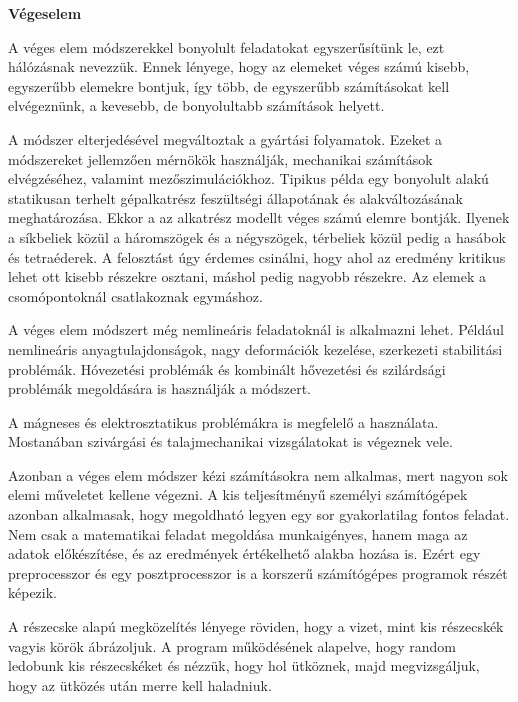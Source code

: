 


\textbf{Végeselem}

A véges elem módszerekkel
bonyolult feladatokat egyszerűsítünk le, ezt hálózásnak nevezzük. Ennek lényege, hogy az elemeket véges számú kisebb, egyszerűbb elemekre bontjuk, így több, de egyszerűbb számításokat kell elvégeznünk, a kevesebb, de bonyolultabb számítások helyett.


A módszer elterjedésével megváltoztak a gyártási folyamatok. Ezeket a módszereket jellemzően mérnökök használják, mechanikai számítások elvégzéséhez, valamint mezőszimulációkhoz. Tipikus példa egy bonyolult alakú statikusan terhelt gépalkatrész feszültségi állapotának és alakváltozásának meghatározása. Ekkor a az alkatrész modellt véges számú elemre bontják. Ilyenek a síkbeliek közül a háromszögek és a négyszögek, térbeliek közül pedig a hasábok és tetraéderek. A felosztást úgy érdemes csinálni, hogy ahol az eredmény kritikus lehet ott kisebb részekre osztani, máshol pedig nagyobb részekre. Az elemek a csomópontoknál csatlakoznak egymáshoz. 


A véges elem módszert még nemlineáris feladatoknál is alkalmazni lehet. Például nemlineáris anyagtulajdonságok, nagy deformációk kezelése, szerkezeti stabilitási problémák. Hóvezetési problémák és kombinált hővezetési és szilárdsági problémák megoldására is használják a módszert. 


A mágneses és elektrosztatikus problémákra is megfelelő a használata. Mostanában szivárgási és talajmechanikai vizsgálatokat is végeznek vele. 

Azonban a véges elem módszer kézi számításokra nem alkalmas, mert nagyon sok elemi műveletet kellene végezni. A kis teljesítményű személyi számítógépek azonban alkalmasak, hogy megoldható legyen egy sor gyakorlatilag fontos feladat. Nem csak a matematikai feladat megoldása munkaigényes, hanem maga az adatok előkészítése, és az eredmények értékelhető alakba hozása is. Ezért egy preprocesszor és egy posztprocesszor is a korszerű számítógépes programok részét képezik.   






A részecske alapú megközelítés lényege röviden, hogy a vizet, mint kis részecskék vagyis körök ábrázoljuk. A program működésének alapelve, hogy random ledobunk kis részecskéket és nézzük, hogy hol ütköznek, majd megvizsgáljuk, hogy az ütközés után merre kell haladniuk. 

